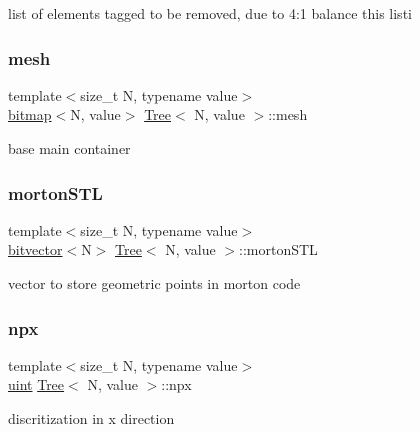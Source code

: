 list of elements tagged to be removed, due to 4\+:1 balance this listi \mbox{\label{classTree_a2baee1e4878452eac675671775360145}} 
\subsubsection{\texorpdfstring{mesh}{mesh}}
{\footnotesize\ttfamily template$<$size\+\_\+t N, typename value$>$ \\
\mbox{\hyperlink{definitions_8h_acf2396ef4de9eb8a6324b9f1a624ea85}{bitmap}}$<$N, value$>$ \mbox{\hyperlink{classTree}{Tree}}$<$ N, value $>$\+::mesh\hspace{0.3cm}{\ttfamily [private]}}

base main container \mbox{\label{classTree_ab97dba8fe7958a363ff7eac2f8199dba}} 
\subsubsection{\texorpdfstring{morton\+S\+TL}{mortonSTL}}
{\footnotesize\ttfamily template$<$size\+\_\+t N, typename value$>$ \\
\mbox{\hyperlink{definitions_8h_a55821d7929f3f16aaf1466129c209492}{bitvector}}$<$N$>$ \mbox{\hyperlink{classTree}{Tree}}$<$ N, value $>$\+::morton\+S\+TL\hspace{0.3cm}{\ttfamily [private]}}

vector to store geometric points in morton code \mbox{\label{classTree_a18a47db1dd6763090994bfe28d89b8f6}} 
\subsubsection{\texorpdfstring{npx}{npx}}
{\footnotesize\ttfamily template$<$size\+\_\+t N, typename value$>$ \\
\mbox{\hyperlink{definitions_8h_a69aa29b598b851b0640aa225a9e5d61d}{uint}} \mbox{\hyperlink{classTree}{Tree}}$<$ N, value $>$\+::npx\hspace{0.3cm}{\ttfamily [protected]}}

discritization in x direction \mbox{\label{classTree_af436baa75e35a4786a377b6fe237c5e0}} 

